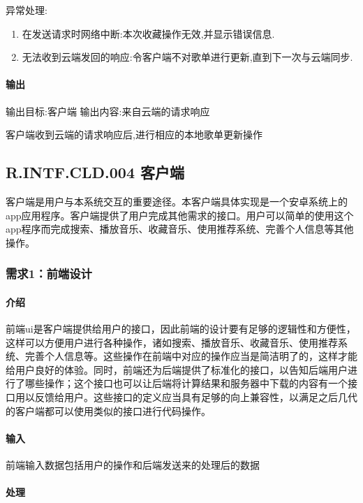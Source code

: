 异常处理:
\begin{enumerate}
	\item 在发送请求时网络中断:本次收藏操作无效,并显示错误信息.
	\item  无法收到云端发回的响应:令客户端不对歌单进行更新,直到下一次与云端同步.
\end{enumerate}


\paragraph{输出}

输出目标:客户端
输出内容:来自云端的请求响应

客户端收到云端的请求响应后,进行相应的本地歌单更新操作

\subsection{R.INTF.CLD.004 客户端}

客户端是用户与本系统交互的重要途径。本客户端具体实现是一个安卓系统上的app应用程序。客户端提供了用户完成其他需求的接口。用户可以简单的使用这个app程序而完成搜索、播放音乐、收藏音乐、使用推荐系统、完善个人信息等其他操作。

\subsubsection{需求1：前端设计}

\paragraph{介绍}

前端ui是客户端提供给用户的接口，因此前端的设计要有足够的逻辑性和方便性，这样可以方便用户进行各种操作，诸如搜索、播放音乐、收藏音乐、使用推荐系统、完善个人信息等。这些操作在前端中对应的操作应当是简洁明了的，这样才能给用户良好的体验。同时，前端还为后端提供了标准化的接口，以告知后端用户进行了哪些操作；这个接口也可以让后端将计算结果和服务器中下载的内容有一个接口用以反馈给用户。这些接口的定义应当具有足够的向上兼容性，以满足之后几代的客户端都可以使用类似的接口进行代码操作。

\paragraph{输入}

前端输入数据包括用户的操作和后端发送来的处理后的数据

\paragraph{处理}

